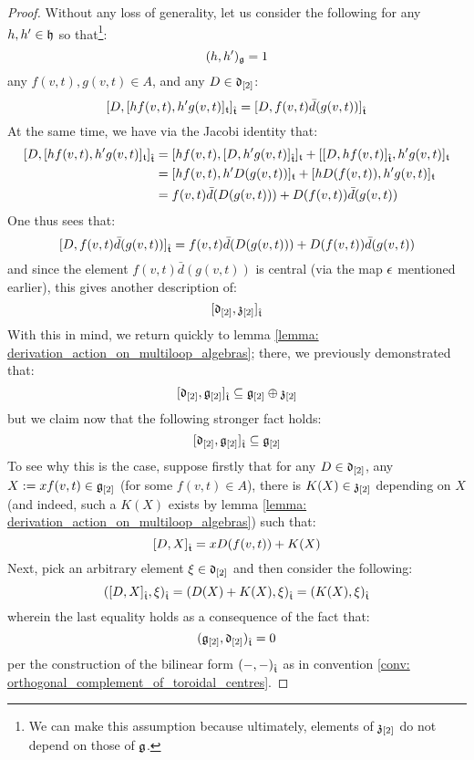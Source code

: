             \begin{proof}
                Without any loss of generality, let us consider the following for any $h, h' \in \mathfrak{h}$ so that\footnote{We can make this assumption because ultimately, elements of $\mathfrak{z}_{[2]}$ do not depend on those of $\mathfrak{g}$.}:
                    $$(h, h')_{\mathfrak{g}} = 1$$
                any $f(v, t), g(v, t) \in A$, and any $D \in \mathfrak{d}_{[2]}$:
                    $$[ D, [h f(v, t), h' g(v, t)]_{\mathfrak{t}} ]_{\hat{\mathfrak{t}}} = [ D, f(v, t) \bar{d}( g(v, t) ) ]_{\hat{\mathfrak{t}}}$$
                At the same time, we have via the Jacobi identity that:
                    $$
                        \begin{aligned}
                            [ D, [h f(v, t), h' g(v, t)]_{\toroidal} ]_{\extendedtoroidal} & = [ h f(v, t), [D, h' g(v, t)]_{\extendedtoroidal} ]_{\toroidal} + [ [D, h f(v, t)]_{\extendedtoroidal}, h' g(v, t) ]_{\toroidal}
                            \\
                            & = [ h f(v, t), h' D( g(v, t) ) ]_{\toroidal} + [ h D( f(v, t) ), h' g(v, t) ]_{\toroidal}
                            \\
                            & = f(v, t) \bar{d}( D( g(v, t) ) ) + D( f(v, t) ) \bar{d}(g(v, t))
                        \end{aligned}
                    $$
                One thus sees that:
                    $$[ D, f(v, t) \bar{d}( g(v, t) ) ]_{\hat{\mathfrak{t}}} = f(v, t) \bar{d}( D( g(v, t) ) ) + D( f(v, t) ) \bar{d}(g(v, t))$$
                and since the element $f(v, t) \bar{d}( g(v, t) )$ is central (via the map $\epsilon$ mentioned earlier), this gives another description of:
                    $$[ \mathfrak{d}_{[2]}, \mathfrak{z}_{[2]} ]_{\hat{\mathfrak{t}}}$$
                With this in mind, we return quickly to lemma \ref{lemma: derivation_action_on_multiloop_algebras}; there, we previously demonstrated that:
                    $$[ \mathfrak{d}_{[2]}, \mathfrak{g}_{[2]} ]_{\hat{\mathfrak{t}}} \subseteq \mathfrak{g}_{[2]} \oplus \mathfrak{z}_{[2]}$$
                but we claim now that the following stronger fact holds:
                    $$[ \mathfrak{d}_{[2]}, \mathfrak{g}_{[2]} ]_{\hat{\mathfrak{t}}} \subseteq \mathfrak{g}_{[2]}$$
                To see why this is the case, suppose firstly that for any $D \in \mathfrak{d}_{[2]}$, any $X := x f(v, t) \in \mathfrak{g}_{[2]}$ (for some $f(v, t) \in A$), there is $K(X) \in \mathfrak{z}_{[2]}$ depending on $X$ (and indeed, such a $K(X)$ exists by lemma \ref{lemma: derivation_action_on_multiloop_algebras}) such that:
                    $$[ D, X ]_{\hat{\mathfrak{t}}} = x D( f(v, t) ) + K(X)$$
                Next, pick an arbitrary element $\xi \in \mathfrak{d}_{[2]}$ and then consider the following:
                    $$( [ D, X ]_{\hat{\mathfrak{t}}}, \xi )_{\hat{\mathfrak{t}}} = (D(X) + K(X), \xi)_{\hat{\mathfrak{t}}} = (K(X), \xi)_{\hat{\mathfrak{t}}}$$
                wherein the last equality holds as a consequence of the fact that:
                    $$( \mathfrak{g}_{[2]}, \mathfrak{d}_{[2]} )_{\hat{\mathfrak{t}}} = 0$$
                per the construction of the bilinear form $(-, -)_{\hat{\mathfrak{t}}}$ as in convention \ref{conv: orthogonal_complement_of_toroidal_centres}.
            \end{proof}
